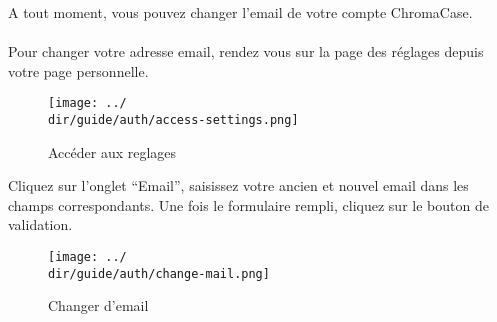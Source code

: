 A tout moment, vous pouvez changer l’email de votre compte ChromaCase.
\\\\
Pour changer votre adresse email, rendez vous sur la page des réglages depuis votre page personnelle.

\begin{figure}[H]
	\texttt{[image: ../\\dir/guide/auth/access-settings.png]}
	\caption{Accéder aux reglages}
\end{figure}

Cliquez sur l'onglet “Email”, saisissez votre ancien et nouvel email dans les champs correspondants. Une fois le formulaire rempli, cliquez sur le bouton de validation.

\begin{figure}[H]
	\texttt{[image: ../\\dir/guide/auth/change-mail.png]}
	\caption{Changer d'email}
\end{figure}